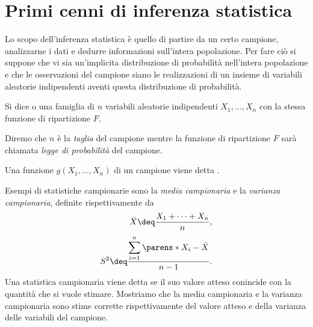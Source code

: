 \section{Primi cenni di inferenza statistica}

Lo scopo dell'inferenza statistica è quello di partire da un certo campione, analizzarne i dati e dedurre informazioni sull'intera popolazione. Per fare ciò si suppone che vi sia un'implicita distribuzione di probabilità nell'intera popolazione e che le osservazioni del campione siano le realizzazioni di un insieme di variabili aleatorie indipendenti aventi questa distribuzione di probabilità.

\begin{definition}
     Si dice  o  una famiglia di $n$ variabili aleatorie indipendenti $X_1, \dots, X_n$ con la stessa funzione di ripartizione $F$.
\end{definition}

Diremo che $n$ è la \emph{taglia} del campione mentre la funzione di ripartizione $F$ sarà chiamata \emph{legge di probabilità} del campione.

\begin{definition}
     Una funzione $g(X_1, \dots, X_n)$ di un campione viene detta .
\end{definition}

Esempi di statistiche campionarie sono la \emph{media campionaria} e la \emph{varianza campionaria}, definite rispettivamente da \begin{align*}
    \bar X \deq \frac{X_1 + \dots + X_n}{n},\\[3pt]
    S^2 \deq \frac{\displaystyle \sum_{i = 1}^n \parens*{X_i - \bar X}}{n-1}.
\end{align*}
Una statistica campionaria viene detta  se il suo valore atteso conincide con la quantità che si vuole stimare. Mostriamo che la media campionaria e la varianza campionaria sono stime corrette rispettivamente del valore atteso e della varianza delle variabili del campione.

